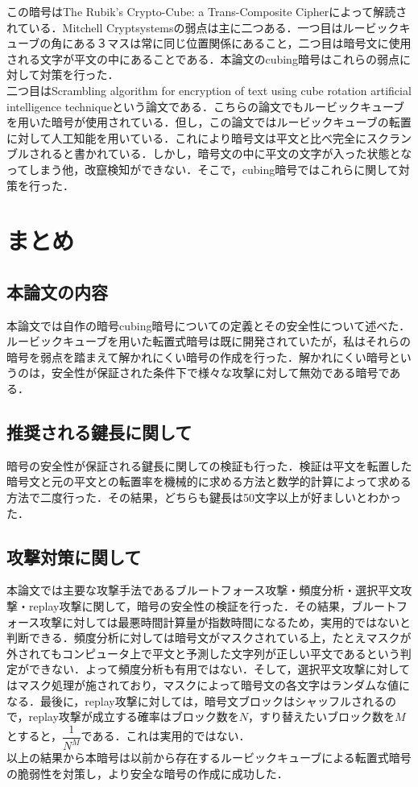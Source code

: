 \documentclass[titlepage]{jarticle}
\begin{document}
この暗号はThe Rubik's Crypto-Cube: a Trans-Composite Cipher\cite{Trans-Composite Cipher}によって解読されている．Mitchell Cryptsystemsの弱点は主に二つある．一つ目はルービックキューブの角にある３マスは常に同じ位置関係にあること，二つ目は暗号文に使用される文字が平文の中にあることである．本論文のcubing暗号はこれらの弱点に対して対策を行った．\\
二つ目はScrambling algorithm for encryption of text using cube rotation artificial intelligence technique\cite{Scrambling algorithm}という論文である．こちらの論文でもルービックキューブを用いた暗号が使用されている．但し，この論文ではルービックキューブの転置に対して人工知能を用いている．これにより暗号文は平文と比べ完全にスクランブルされると書かれている．しかし，暗号文の中に平文の文字が入った状態となってしまう他，改竄検知ができない．そこで，cubing暗号ではこれらに関して対策を行った．

\section{まとめ}

\subsection{本論文の内容}
本論文では自作の暗号cubing暗号についての定義とその安全性について述べた．ルービックキューブを用いた転置式暗号は既に開発されていたが，私はそれらの暗号を弱点を踏まえて解かれにくい暗号の作成を行った．解かれにくい暗号というのは，安全性が保証された条件下で様々な攻撃に対して無効である暗号である．

\subsection{推奨される鍵長に関して}
暗号の安全性が保証される鍵長に関しての検証も行った．検証は平文を転置した暗号文と元の平文との転置率を機械的に求める方法と数学的計算によって求める方法で二度行った．その結果，どちらも鍵長は50文字以上が好ましいとわかった．

\subsection{攻撃対策に関して}
本論文では主要な攻撃手法であるブルートフォース攻撃・頻度分析・選択平文攻撃・replay攻撃に関して，暗号の安全性の検証を行った．その結果，ブルートフォース攻撃に対しては最悪時間計算量が指数時間になるため，実用的ではないと判断できる．頻度分析に対しては暗号文がマスクされている上，たとえマスクが外されてもコンピュータ上で平文と予測した文字列が正しい平文であるという判定ができない．よって頻度分析も有用ではない．そして，選択平文攻撃に対してはマスク処理が施されており，マスクによって暗号文の各文字はランダムな値になる．最後に，replay攻撃に対しては，暗号文ブロックはシャッフルされるので，replay攻撃が成立する確率はブロック数を\(N\)，すり替えたいブロック数を\(M\)とすると，\(\dfrac{1}{N^M}\)である．これは実用的ではない．\\
以上の結果から本暗号は以前から存在するルービックキューブによる転置式暗号の脆弱性を対策し，より安全な暗号の作成に成功した．
\end{document}
